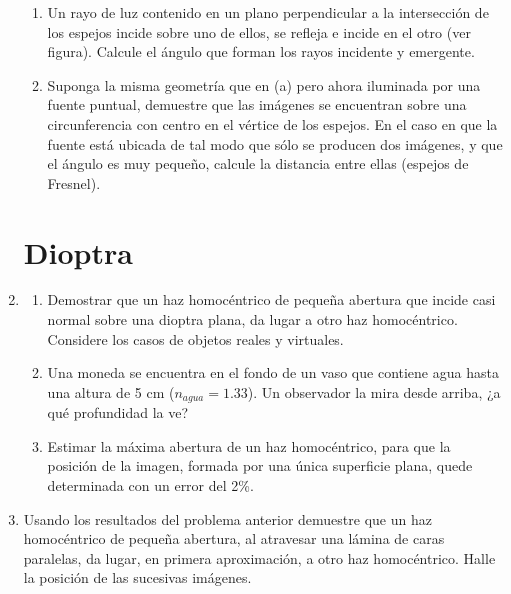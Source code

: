 \documentclass[11pt,spanish,a4paper]{article}
\begin{document}
\begin{enumerate}
\begin{enumerate}
\item Un rayo de luz contenido en un plano perpendicular a la intersección
de los espejos incide sobre uno de ellos, se refleja e incide en el
otro (ver figura). Calcule el ángulo que forman los rayos incidente
y emergente.
\item Suponga la misma geometría que en (a) pero ahora iluminada por una
fuente puntual, demuestre que las imágenes se encuentran sobre una
circunferencia con centro en el vértice de los espejos. En el caso
en que la fuente está ubicada de tal modo que sólo se producen dos
imágenes, y que el ángulo es muy pequeño, calcule la distancia entre
ellas (espejos de Fresnel).
\end{enumerate}


\section*{Dioptra}

\item 
\begin{enumerate}
\item Demostrar que un haz homocéntrico de pequeña abertura que incide casi
normal sobre una dioptra plana, da lugar a otro haz homocéntrico.
Considere los casos de objetos reales y virtuales.
\item Una moneda se encuentra en el fondo de un vaso que contiene agua hasta
una altura de 5 cm ($n_{agua}=1.33$). Un observador la mira desde
arriba, ¿a qué profundidad la ve?
\item Estimar la máxima abertura de un haz homocéntrico, para que la posición
de la imagen, formada por una única superficie plana, quede determinada
con un error del 2\%. 
\end{enumerate}
\item Usando los resultados del problema anterior demuestre que un haz homocéntrico
de pequeña abertura, al atravesar una lámina de caras paralelas, da
lugar, en primera aproximación, a otro haz homocéntrico. Halle la
posición de las sucesivas imágenes. 



\end{enumerate}
\end{document}
